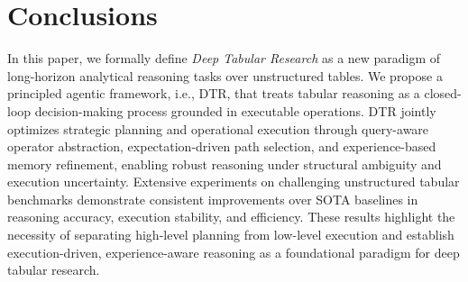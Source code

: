 \vspace{-2mm}
\section{Conclusions}
\vspace{-2mm}
In this paper, we formally define \emph{Deep Tabular Research} as a new paradigm of long-horizon analytical reasoning tasks over unstructured tables. We propose a principled agentic framework, i.e., DTR, that treats tabular reasoning as a closed-loop decision-making process grounded in executable operations. DTR jointly optimizes strategic planning and operational execution through query-aware operator abstraction, expectation-driven path selection, and experience-based memory refinement, enabling robust reasoning under structural ambiguity and execution uncertainty. Extensive experiments on challenging unstructured tabular benchmarks demonstrate consistent improvements over SOTA baselines in reasoning accuracy, execution stability, and efficiency. These results highlight the necessity of separating high-level planning from low-level execution and establish execution-driven, experience-aware reasoning as a foundational paradigm for deep tabular research.
